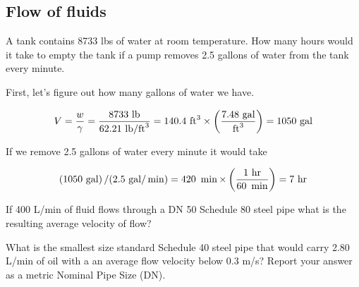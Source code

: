 \documentclass[multi,preview,varwidth=false,border=5,12pt]{standalone}
\begin{document}
\begin{center}
\section*{Flow of fluids}
\end{center}

\begin{question}

A tank contains 8733 lbs of water at room temperature. How many hours would it take to empty the tank if a pump removes 2.5 gallons of water from the tank every minute.

\begin{solution}

First, let's figure out how many gallons of water we have.

\begin{align*}
    V=\frac{w}{\gamma}=\frac{8733~\mathrm{lb}}{62.21~\mathrm{lb}/\mathrm{ft}^3}=140.4~\mathrm{ft}^3\times\left(\frac{7.48~\mathrm{gal}}{\mathrm{ft}^3}\right)=1050~\mathrm{gal}
\end{align*}

If we remove 2.5 gallons of water every minute it would take

\begin{align*}
    \left(1050~\mathrm{gal}\right)/(2.5~\mathrm{gal}/\min) = 420 ~\min \times \left(\frac{1~\mathrm{hr}}{60~\min}\right)=7~\mathrm{hr}
\end{align*}

\end{solution}

\end{question}


\begin{question}

If 400 L/min of fluid flows through a DN 50 Schedule 80 steel pipe what is the resulting average velocity of flow?

\begin{solution}
\end{solution}

\end{question}


\begin{question}

What is the smallest size standard Schedule 40 steel pipe that would carry 2.80 L/min of oil with a an average flow velocity below 0.3 m/s?  Report your answer as a metric Nominal Pipe Size (DN).

\begin{solution}
\end{solution}

\end{question}
\end{document}
